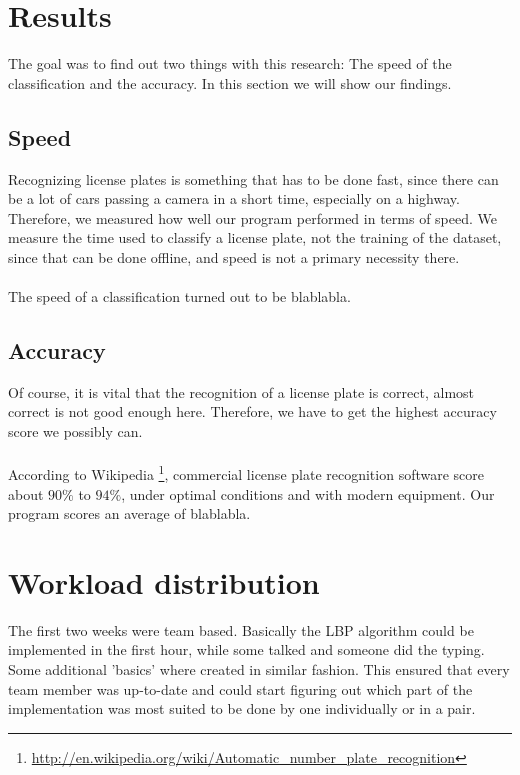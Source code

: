 \documentclass[a4paper]{article}
\begin{document}
\section{Results}

The goal was to find out two things with this research: The speed of the
classification and the accuracy. In this section we will show our findings.

\subsection{Speed}

Recognizing license plates is something that has to be done fast, since there
can be a lot of cars passing a camera in a short time, especially on a highway.
Therefore, we measured how well our program performed in terms of speed. We
measure the time used to classify a license plate, not the training of the
dataset, since that can be done offline, and speed is not a primary necessity
there.\\
\\
The speed of a classification turned out to be blablabla.

\subsection{Accuracy}

Of course, it is vital that the recognition of a license plate is correct,
almost correct is not good enough here. Therefore, we have to get the highest
accuracy score we possibly can.\\
\\ According to Wikipedia
\footnote{
\url{http://en.wikipedia.org/wiki/Automatic_number_plate_recognition}},
commercial license plate recognition software score about $90\%$ to $94\%$,
under optimal conditions and with modern equipment. Our program scores an
average of blablabla.

\section{Workload distribution}

The first two weeks were team based. Basically the LBP algorithm could be
implemented in the first hour, while some talked and someone did the typing.
Some additional 'basics' where created in similar fashion. This ensured that
every team member was up-to-date and could start figuring out which part of the
implementation was most suited to be done by one individually or in a pair.
\end{document}
